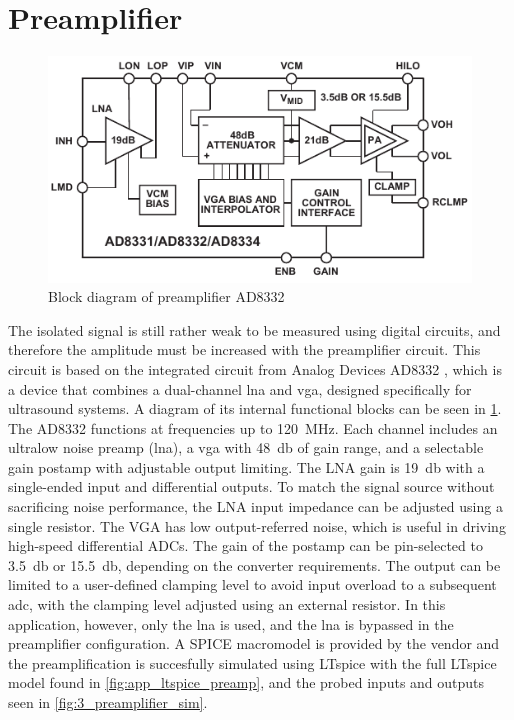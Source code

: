 \section{Preamplifier}
\begin{figure}[htbp]
	\centering
	\includegraphics[width=.8\textwidth]{Figures/3_ad8332_block.pdf}
	\caption{Block diagram of preamplifier AD8332 \cite{AD8332}}
	\label{fig:3_preamplifier_block}
\end{figure}
The isolated signal is still rather weak to be measured using digital circuits, and therefore the amplitude must be increased with the preamplifier circuit. This circuit is based on the integrated circuit from Analog Devices AD8332 \cite{AD8332}, which is a device that combines a dual-channel \gls{lna} and \gls{vga}, designed specifically for ultrasound systems. A diagram of its internal functional blocks can be seen in \cref{fig:3_preamplifier_block}. The AD8332 functions at frequencies up to \qty{120}{\mega\hertz}. Each channel includes an ultralow noise preamp (\gls{lna}), a \gls{vga} with \qty{48}{\decibel} of gain range, and a selectable gain postamp with adjustable output limiting. The LNA gain is \qty{19}{\decibel} with a single-ended input and differential outputs. To match the signal source without sacrificing noise performance, the LNA input impedance can be adjusted using a single resistor. The VGA has low output-referred noise, which is useful in driving high-speed differential ADCs. The gain of the postamp can be pin-selected to \qty{3.5}{\decibel} or \qty{15.5}{\decibel}, depending on the converter requirements. The output can be limited to a user-defined clamping level to avoid input overload to a subsequent \gls{adc}, with the clamping level adjusted using an external resistor. In this application, however, only the \gls{lna} is used, and the \gls{lna} is bypassed in the preamplifier configuration. A SPICE macromodel is provided by the vendor and the preamplification is succesfully simulated using LTspice with the full LTspice model found in \cref{fig:app_ltspice_preamp}, and the probed inputs and outputs seen in \cref{fig:3_preamplifier_sim}.

